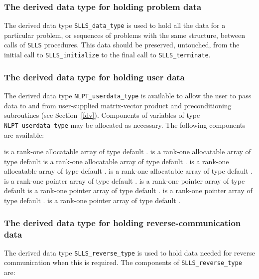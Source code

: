 \documentclass{galahad}
\newcommand{\packagename}{SLLS}
\begin{document}
\subsubsection{The derived data type for holding problem data}\label{typedata}
The derived data type
{\tt \packagename\_data\_type}
is used to hold all the data for a particular problem,
or sequences of problems with the same structure, between calls of
{\tt \packagename} procedures.
This data should be preserved, untouched, from the initial call to
{\tt \packagename\_initialize}
to the final call to
{\tt \packagename\_terminate}.


\subsubsection{The derived data type for holding user data}\label{typeuserdata}
The derived data type
{\tt NLPT\_userdata\_type}
is available to allow the user to pass data to and from user-supplied
matrix-vector product and preconditioning
subroutines (see Section~\ref{fdv}).
Components of variables of type {\tt NLPT\_userdata\-\_type} may be allocated as
necessary. The following components are available:

\begin{description}
 is a rank-one allocatable array of type default \integer.
 is a rank-one allocatable array of type default  \realdp
{} is a rank-one allocatable array of type default \complexdp.
 is a rank-one allocatable array of type default \character.
 is a rank-one allocatable array of type default \logical.
 is a rank-one pointer array of type default \integer.
 is a rank-one pointer array of type default  \realdp
{} is a rank-one pointer array of type default \complexdp.
 is a rank-one pointer array of type default \character.
 is a rank-one pointer array of type default \logical.
\end{description}


\subsubsection{The derived data type for holding reverse-communication data}\label{typereverse}
The derived data type
{\tt \packagename\_reverse\_type}
is used to hold data needed for reverse communication when this is
required.
The components of
{\tt \packagename\_reverse\_type}
are:
\end{document}
